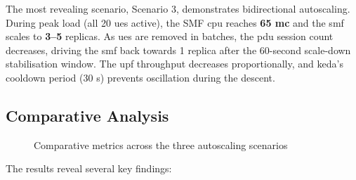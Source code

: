The most revealing scenario, Scenario 3, demonstrates bidirectional autoscaling. During peak load (all 20 \glspl{ue} active), the SMF \gls{cpu} reaches \textbf{65 mc} and the \gls{smf} scales to \textbf{3–5} replicas. As \glspl{ue} are removed in batches, the \gls{pdu} session count decreases, driving the \gls{smf} back towards 1 replica after the 60-second scale-down stabilisation window. The \gls{upf} throughput decreases proportionally, and \gls{keda}'s cooldown period (30 s) prevents oscillation during the descent.

\subsection{Comparative Analysis}

\begin{figure}[H]
  \centering
  \caption{Comparative metrics across the three autoscaling scenarios}
  \label{fig:comparison}
\end{figure}

The results reveal several key findings:


